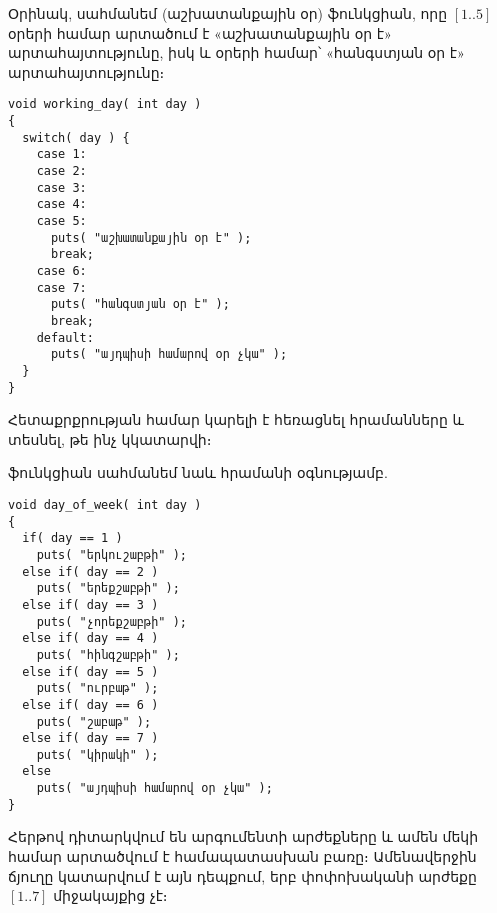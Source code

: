 Օրինակ, սահմանեմ  (աշխատանքային օր) ֆունկցիան, որը
\([1..5]\) օրերի համար արտածում է «աշխատանքային օր է» արտահայտությունը, իսկ
 և  օրերի համար՝ «հանգստյան օր է» արտահայտությունը։

\begin{Verbatim}
void working_day( int day )
{
  switch( day ) {
    case 1:
    case 2:
    case 3:
    case 4:
    case 5:
      puts( "աշխատանքային օր է" );
      break;
    case 6:
    case 7:
      puts( "հանգստյան օր է" );
      break;
    default:
      puts( "այդպիսի համարով օր չկա" );
  }
}
\end{Verbatim}

Հետաքրքրության համար կարելի է հեռացնել  հրամանները և տեսնել,
թե ինչ կկատարվի։


 ֆունկցիան սահմանեմ նաև  հրամանի օգնությամբ.

\begin{Verbatim}
void day_of_week( int day )
{
  if( day == 1 )
    puts( "երկուշաբթի" );
  else if( day == 2 )
    puts( "երեքշաբթի" );
  else if( day == 3 )
    puts( "չորեքշաբթի" );
  else if( day == 4 )
    puts( "հինգշաբթի" );
  else if( day == 5 )
    puts( "ուրբաթ" );
  else if( day == 6 )
    puts( "շաբաթ" );
  else if( day == 7 )
    puts( "կիրակի" );
  else
    puts( "այդպիսի համարով օր չկա" );
}
\end{Verbatim}

Հերթով դիտարկվում են  արգումենտի արժեքները և ամեն մեկի համար
արտածվում է համապատասխան բառը։ Ամենավերջին  ճյուղը կատարվում
է այն դեպքում, երբ  փոփոխականի արժեքը \([1..7]\) միջակայքից չէ։
